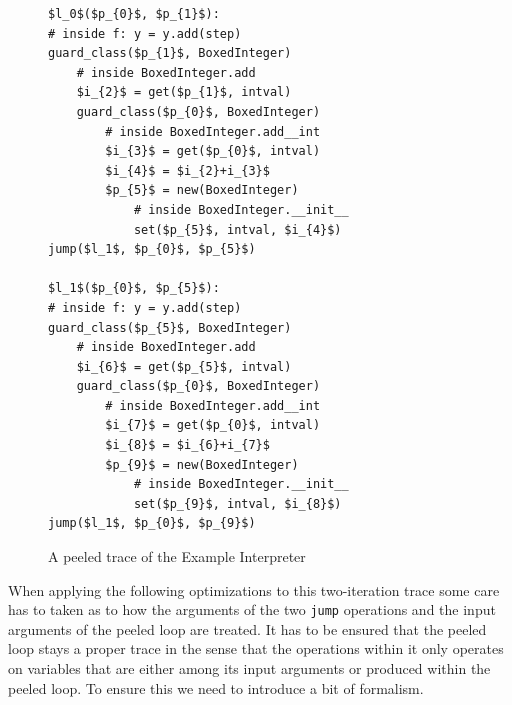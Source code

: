 \documentclass[preprint]{sigplanconf}
\begin{document}
\begin{figure}
\begin{lstlisting}[mathescape,numbers = right,basicstyle=\setstretch{1.05}\ttfamily\scriptsize]
$l_0$($p_{0}$, $p_{1}$):
# inside f: y = y.add(step)
guard_class($p_{1}$, BoxedInteger)
    # inside BoxedInteger.add
    $i_{2}$ = get($p_{1}$, intval)
    guard_class($p_{0}$, BoxedInteger)
        # inside BoxedInteger.add__int
        $i_{3}$ = get($p_{0}$, intval)
        $i_{4}$ = $i_{2}+i_{3}$
        $p_{5}$ = new(BoxedInteger)
            # inside BoxedInteger.__init__
            set($p_{5}$, intval, $i_{4}$)
jump($l_1$, $p_{0}$, $p_{5}$)

$l_1$($p_{0}$, $p_{5}$):
# inside f: y = y.add(step)
guard_class($p_{5}$, BoxedInteger)
    # inside BoxedInteger.add
    $i_{6}$ = get($p_{5}$, intval)
    guard_class($p_{0}$, BoxedInteger)
        # inside BoxedInteger.add__int
        $i_{7}$ = get($p_{0}$, intval)
        $i_{8}$ = $i_{6}+i_{7}$
        $p_{9}$ = new(BoxedInteger)
            # inside BoxedInteger.__init__
            set($p_{9}$, intval, $i_{8}$)
jump($l_1$, $p_{0}$, $p_{9}$)
\end{lstlisting}
\caption{A peeled trace of the Example Interpreter}
\label{fig:peeled-trace}
\end{figure}

When applying the following optimizations to this two-iteration trace
some care has to taken as to how the arguments of the two
\lstinline{jump} operations and the input arguments of the peeled loop are
treated. It has to be ensured that the peeled loop stays a proper
trace in the sense that the operations within it only operates on
variables that are either among its input arguments 
or produced within the peeled loop. To ensure this we need
to introduce a bit of formalism.
\end{document}
